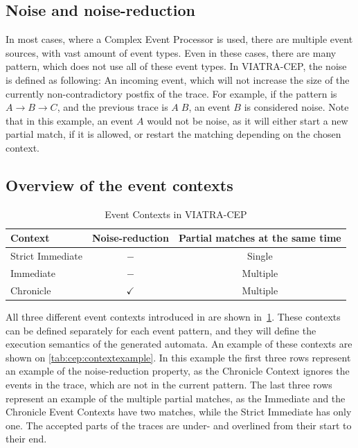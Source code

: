 \subsection{Noise and noise-reduction}
In most cases, where a Complex Event Processor is used, there are multiple event sources, with vast amount of event types.
Even in these cases, there are many pattern, which does not use all of these event types.
In VIATRA-CEP, the noise is defined as following: An incoming event, which will not increase the size of the currently non-contradictory postfix of the trace.
For example, if the pattern is $A \rightarrow B \rightarrow C$, and the previous trace is $A\;B$, an event $B$ is considered noise. Note that in this example, an event $A$ would not be noise, as it will either start a new partial match, if it is allowed, or restart the matching depending on the chosen context.

\subsection{Overview of the event contexts}

\begin{table}
	\caption{Event Contexts in VIATRA-CEP}		
	\label{tab:cep:contexts}
	\begin{tabularx}{\textwidth}{lcc}
		\toprule
		Context          & Noise-reduction & Partial matches at the same time \\ \midrule
		Strict Immediate &       $-$       &              Single              \\
		Immediate        &       $-$       &             Multiple             \\
		Chronicle        &  $\checkmark$   &             Multiple             \\ \bottomrule
	\end{tabularx}
\end{table}

All three different event contexts introduced in \citep{davidi} are shown in~\cref{tab:cep:contexts}.
These contexts can be defined separately for each event pattern, and they will define the execution semantics of the generated automata. 
An example of these contexts are shown on \cref{tab:cep:contextexample}. In this example the first three rows represent an example of the noise-reduction property, as the Chronicle Context ignores the events in the trace, which are not in the current pattern.
The last three rows represent an example of the multiple partial matches, as the Immediate and the Chronicle Event Contexts have two matches, while the Strict Immediate has only one.
The accepted parts of the traces are under- and overlined from their start to their end.



